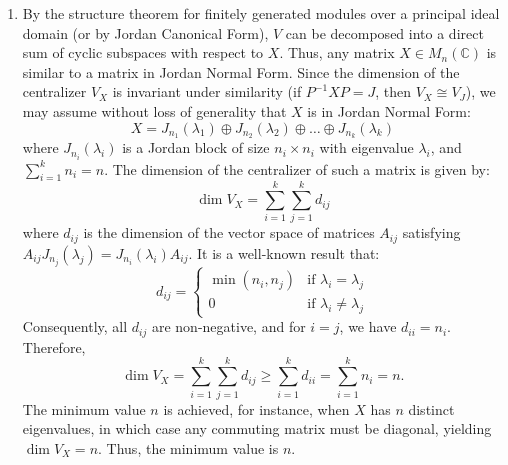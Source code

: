 \documentclass{article}
\begin{document}
\begin{enumerate}[label=\fbox{\arabic*}]
  \item %
        By the structure theorem for finitely generated modules over a principal ideal domain (or by Jordan Canonical Form), $V$ can be decomposed into a direct sum of cyclic subspaces with respect to $X$. Thus, any matrix $X \in M_n(\mathbb{C})$ is similar to a matrix in Jordan Normal Form. Since the dimension of the centralizer $V_X$ is invariant under similarity (if $P^{-1}XP = J$, then $V_X \cong V_J$), we may assume without loss of generality that $X$ is in Jordan Normal Form:
        \[
          X = J_{n_1}(\lambda_1) \oplus J_{n_2}(\lambda_2) \oplus \dots \oplus J_{n_k}(\lambda_k)
        \]
        where $J_{n_i}(\lambda_i)$ is a Jordan block of size $n_i \times n_i$ with eigenvalue $\lambda_i$, and $\sum_{i=1}^k n_i = n$.
        The dimension of the centralizer of such a matrix is given by:
        \[
          \dim V_X = \sum_{i=1}^k \sum_{j=1}^k d_{ij}
        \]
        where $d_{ij}$ is the dimension of the vector space of matrices $A_{ij}$ satisfying $A_{ij} J_{n_j}(\lambda_j) = J_{n_i}(\lambda_i) A_{ij}$. It is a well-known result that:
        \[
          d_{ij} = \begin{cases} \min(n_i, n_j) & \text{if } \lambda_i = \lambda_j \\ 0 & \text{if } \lambda_i \neq \lambda_j \end{cases}
        \]
        Consequently, all $d_{ij}$ are non-negative, and for $i = j$, we have $d_{ii} = n_i$. Therefore,
        \[
          \dim V_X = \sum_{i=1}^k \sum_{j=1}^k d_{ij} \ge \sum_{i=1}^k d_{ii} = \sum_{i=1}^k n_i = n.
        \]
        The minimum value $n$ is achieved, for instance, when $X$ has $n$ distinct eigenvalues, in which case any commuting matrix must be diagonal, yielding $\dim V_X = n$. Thus, the minimum value is $n$.


\end{enumerate}
\end{document}
